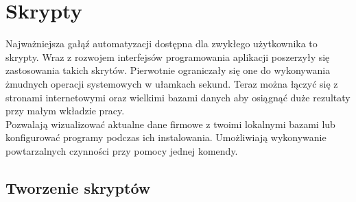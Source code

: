 \documentclass[10pt,a4paper]{report}
\begin{document}
	\section{Skrypty}
	
Najważniejsza gałąź automatyzacji dostępna dla zwykłego użytkownika to skrypty. Wraz z
rozwojem interfejsów programowania aplikacji poszerzyły się zastosowania takich skrytów.
Pierwotnie ograniczały się one do wykonywania żmudnych operacji systemowych w
ułamkach sekund. Teraz można łączyć się z stronami internetowymi oraz wielkimi bazami
danych aby osiągnąć duże rezultaty przy małym wkładzie pracy.\\

Pozwalają wizualizować aktualne dane firmowe z twoimi lokalnymi bazami lub konfigurować
programy podczas ich instalowania. Umożliwiają wykonywanie powtarzalnych czynności
przy pomocy jednej komendy.	

\subsection{Tworzenie skryptów}
\end{document}
